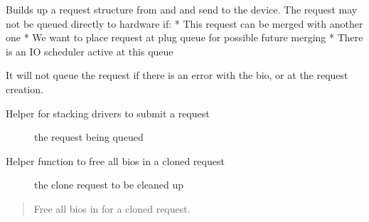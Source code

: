 \documentclass[a4paper,11pt,english]{sphinxmanual}
\begin{document}

Builds up a request structure from  and  and send to the device. The
request may not be queued directly to hardware if:
* This request can be merged with another one
* We want to place request at plug queue for possible future merging
* There is an IO scheduler active at this queue

It will not queue the request if there is an error with the bio, or at the
request creation.

\begin{fulllineitems}
\label{\detokenize{blk-mq:c.blk_insert_cloned_request}}
Helper for stacking drivers to submit a request

\end{fulllineitems}


\begin{description}
\item[{}] \leavevmode
the request being queued

\end{description}

\begin{fulllineitems}
\label{\detokenize{blk-mq:c.blk_rq_unprep_clone}}
Helper function to free all bios in a cloned request

\end{fulllineitems}


\begin{description}
\item[{}] \leavevmode
the clone request to be cleaned up

\end{description}

\begin{quote}

Free all bios in  for a cloned request.
\end{quote}
\end{document}
